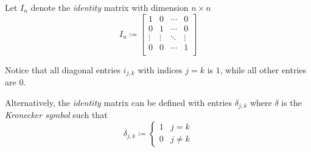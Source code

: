 \begin{definition}
    Let $I_n$ denote the \textit{identity} matrix with dimension $n \times n$
    \begin{equation}
        I_n \coloneqq \begin{bmatrix}
            1      & 0      & \cdots & 0      \\
            0      & 1      & \cdots & 0      \\
            \vdots & \vdots & \ddots & \vdots \\
            0      & 0      & \cdots & 1      \\
        \end{bmatrix}
    \end{equation}
    
    Notice that all diagonal entries $i_{j, k}$ with indices $j = k$ is $1$, while all other entries are $0$.
    
    Alternatively, the \textit{identity} matrix can be defined with entries $\delta_{j, k}$ where $\delta$ is the \textit{Kronecker symbol} such that
    \begin{equation}
        \delta_{j, k} \coloneqq \begin{cases}
            1 & j = k \\
            0 & j \ne k
        \end{cases}
    \end{equation}
\end{definition}

